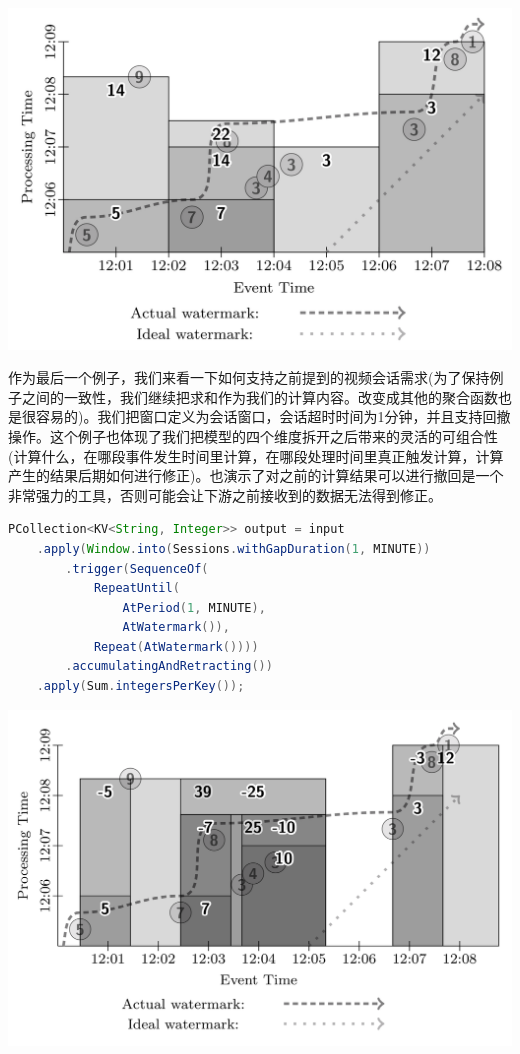 \documentclass[oneside]{ctexbook}
\begin{document}
\noindent \includegraphics[width=\textwidth]{fixedwindowsstreamingpartial.png}

作为最后一个例子，我们来看一下如何支持之前提到的视频会话需求(为了保持例子之间的一致性，我们继续把求和作为我们的计算内容。改变成其他的聚合函数也是很容易的)。我们把窗口定义为会话窗口，会话超时时间为1分钟，并且支持回撤操作。这个例子也体现了我们把模型的四个维度拆开之后带来的灵活的可组合性(计算什么，在哪段事件发生时间里计算，在哪段处理时间里真正触发计算，计算产生的结果后期如何进行修正)。也演示了对之前的计算结果可以进行撤回是一个非常强力的工具，否则可能会让下游之前接收到的数据无法得到修正。

\begin{lstlisting}[language=java]
PCollection<KV<String, Integer>> output = input
    .apply(Window.into(Sessions.withGapDuration(1, MINUTE))
        .trigger(SequenceOf(
            RepeatUntil(
                AtPeriod(1, MINUTE),
                AtWatermark()),
            Repeat(AtWatermark())))
        .accumulatingAndRetracting())
    .apply(Sum.integersPerKey());
\end{lstlisting}

\noindent \includegraphics[width=\textwidth]{sessionsretract.png}
\end{document}
